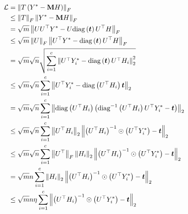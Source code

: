 \documentclass{article} %
\begin{document}
\begin{equation}
	\begin{aligned}
		{\mathcal{L}}&=\left\|T\left(Y^*-{\mathbf{M}} H\right)\right\|_F\\
		&\leq\left\|T\right\|_F\left\|Y^*-{\mathbf{M}} H\right\|_F\\
		&=\sqrt{m}\left\|UU^{\top}Y^*-U\mathrm{diag}\left({\bm{t}}\right)U^{\top}H\right\|_F\\
		&\leq\sqrt{m}\left\|U\right\|_F\left\|U^{\top}Y^*-\mathrm{diag}\left({\bm{t}}\right)U^{\top}H\right\|_F\\
		&=\sqrt{m}\sqrt{n}\sqrt{\sum_{i=1}^c\left\|U^{\top}Y^*_i-\mathrm{diag}\left({\bm{t}}\right)U^{\top}H_i\right\|^2_2}\\
		&\leq\sqrt{m}\sqrt{n}\sum_{i=1}^c\left\|U^{\top}Y^*_i-\mathrm{diag}\left(U^{\top}H_i\right){\bm{t}}\right\|_2\\
		&=\sqrt{m}\sqrt{n}\sum_{i=1}^c\left\|\mathrm{diag}\left(U^{\top}H_i\right)\left(\mathrm{diag}^{-1}\left(U^{\top}H_i\right)U^{\top}Y^*_i-{\bm{t}}\right)\right\|_2\\
		&\leq\sqrt{m}\sqrt{n}\sum_{i=1}^c\left\|U^{\top}H_i\right\|_2\left\|\left(U^{\top}H_i\right)^{-1}\odot\left(U^{\top}Y^*_i\right)-{\bm{t}}\right\|_2\\
		&\leq\sqrt{m}\sqrt{n}\sum_{i=1}^c\left\|U^{\top}\right\|_F\left\|H_i\right\|_2\left\|\left(U^{\top}H_i\right)^{-1}\odot\left(U^{\top}Y^*_i\right)-{\bm{t}}\right\|_2\\
		&=\sqrt{m}n\sum_{i=1}^c\left\|H_i\right\|_2\left\|\left(U^{\top}H_i\right)^{-1}\odot\left(U^{\top}Y^*_i\right)-{\bm{t}}\right\|_2\\
		&\leq\sqrt{m}n\eta\sum_{i=1}^c\left\|\left(U^{\top}H_i\right)^{-1}\odot\left(U^{\top}Y^*_i\right)-{\bm{t}}\right\|_2
	\end{aligned}
\end{equation}
\end{document}
